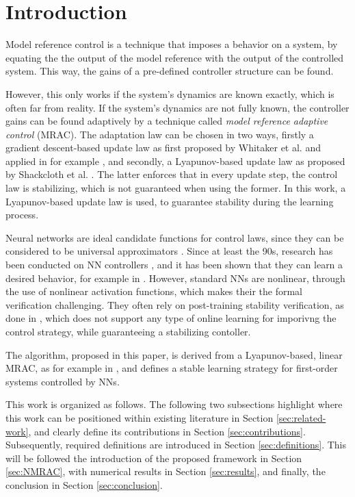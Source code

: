 \section{Introduction}
Model reference control is a technique that imposes a behavior on a system, by equating the the output of the model reference with the output of the controlled system. This way, the gains of a pre-defined controller structure can be found. 

However, this only works if the system's dynamics are known exactly, which is often far from reality. If the system's dynamics are not fully known, the controller gains can be found adaptively by a technique called \textit{model reference adaptive control} (MRAC). The adaptation law can be chosen in two ways, firstly a gradient descent-based update law as first proposed by Whitaker et al. \cite{whitaker1959adaptive} and applied in for example \cite{wahby, bosshartComparisonTwoPID2021}, and secondly, a Lyapunov-based update law as proposed by Shackcloth et al. \cite{shackclothSynthesisModelReference1965}. The latter enforces that in every update step, the control law is stabilizing, which is not guaranteed when using the former. In this work, a Lyapunov-based update law is used, to guarantee stability during the learning process.

Neural networks are ideal candidate functions for control laws, since they can be considered to be universal approximators \cite{hornikUniversalApproximationUnknown1990a}. Since at least the 90s, research has been conducted on NN controllers \cite{jiangBriefReviewNeural2017}, and it has been shown that they can learn a desired behavior, for example in \cite{wahby, congPIDLikeNeuralNetwork2009,thanhNonlinearPIDControl2006,norrisNeuralNetworksControl2021}. However, standard NNs are nonlinear, through the use of nonlinear activation functions, which makes their the formal verification challenging. They often rely on post-training stability verification, as done in \cite{kordaStabilityPerformanceVerification2022, revay_convex_2021}, which does not support any type of online learning for imporivng the control strategy, while guaranteeing a stabilizing contoller.

The algorithm, proposed in this paper, is derived from a Lyapunov-based, linear MRAC, as for example in \cite{lavretskyCombinedCompositeModel2009, slamaModelReferenceAdaptive2018,astromAdaptiveControl2008}, and defines a stable learning strategy for first-order systems controlled by NNs.

This work is organized as follows. The following two subsections highlight where this work can be positioned within existing literature in Section \ref{sec:related-work}, and clearly define its contributions in Section \ref{sec:contributions}. Subsequently, required definitions are introduced in Section \ref{sec:definitions}. This will be followed the introduction of the proposed framework in Section \ref{sec:NMRAC}, with numerical results in Section \ref{sec:results}, and finally, the conclusion in Section \ref{sec:conclusion}.